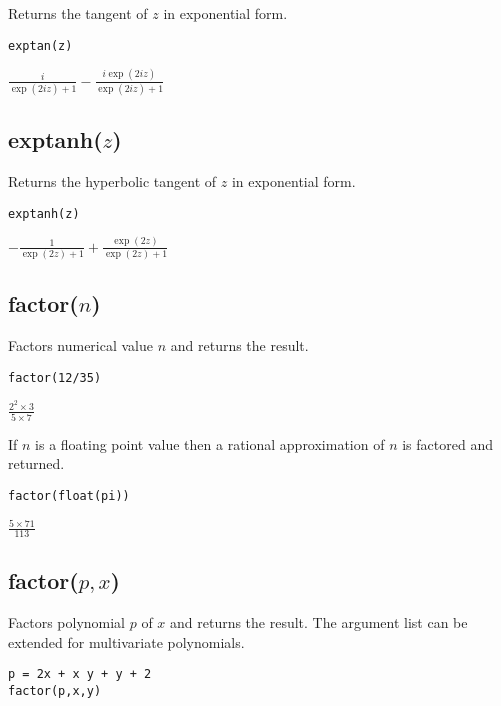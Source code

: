 Returns the tangent of $z$ in exponential form.

{\color{blue}
\begin{verbatim}
exptan(z)
\end{verbatim}
}

\noindent
$\displaystyle \frac{i}{\exp(2iz)+1}-\frac{i\exp(2iz)}{\exp(2iz)+1}$

\subsection*{exptanh($z$)}

Returns the hyperbolic tangent of $z$ in exponential form.

{\color{blue}
\begin{verbatim}
exptanh(z)
\end{verbatim}
}

\noindent
$\displaystyle -\frac{1}{\exp(2z)+1}+\frac{\exp(2z)}{\exp(2z)+1}$

\subsection*{factor($n$)}

Factors numerical value $n$ and returns the result.

{\color{blue}
\begin{verbatim}
factor(12/35)
\end{verbatim}
}

\noindent
$\displaystyle \frac{2^2\times 3}{5\times 7}$

\bigskip
\noindent
If $n$ is a floating point value then a rational approximation of $n$ is factored and returned.

{\color{blue}
\begin{verbatim}
factor(float(pi))
\end{verbatim}
}

\noindent
$\displaystyle \frac{5\times 71}{113}$

\subsection*{factor($p,x$)}

Factors polynomial $p$ of $x$ and returns the result.
The argument list can be extended for multivariate polynomials.

{\color{blue}
\begin{verbatim}
p = 2x + x y + y + 2
factor(p,x,y)
\end{verbatim}
}

